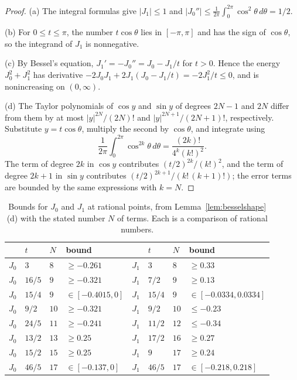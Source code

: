 \documentclass[10pt]{article}
\theoremstyle{remark}
\begin{document}
\begin{proof}
(a) The integral formulas give $|J_1|\le1$ and $|J_0''|\le\frac1{2\pi}\int_0^{2\pi}\cos^2\theta\,d\theta=1/2$.

(b) For $0\le t\le\pi$, the number $t\cos\theta$ lies in $[-\pi,\pi]$ and has the sign of $\cos\theta$, so the integrand of $J_1$ is nonnegative.

(c) By Bessel's equation, $J_1'=-J_0''=J_0-J_1/t$ for $t>0$. Hence the energy $J_0^2+J_1^2$ has derivative $-2J_0J_1+2J_1(J_0-J_1/t)=-2J_1^2/t\le0$, and is nonincreasing on $(0,\infty)$.

(d) The Taylor polynomials of $\cos y$ and $\sin y$ of degrees $2N-1$ and $2N$ differ from them by at most $|y|^{2N}/(2N)!$ and $|y|^{2N+1}/(2N+1)!$, respectively. Substitute $y=t\cos\theta$, multiply the second by $\cos\theta$, and integrate using
\[
 \frac1{2\pi}\int_0^{2\pi}\cos^{2k}\theta\,d\theta=\frac{(2k)!}{4^k(k!)^2}.
\]
The term of degree $2k$ in $\cos y$ contributes $(t/2)^{2k}/(k!)^2$, and the term of degree $2k+1$ in $\sin y$ contributes $(t/2)^{2k+1}/(k!\,(k+1)!)$; the error terms are bounded by the same expressions with $k=N$.
\end{proof}

\begin{table}[ht]
\centering
\begin{tabular}{llll|llll}
 & $t$ & $N$ & bound & & $t$ & $N$ & bound\\\hline
 $J_0$ & $3$ & $8$ & $\ge-0.261$ & $J_1$ & $3$ & $8$ & $\ge0.33$\\
 $J_0$ & $16/5$ & $9$ & $\ge-0.321$ & $J_1$ & $7/2$ & $9$ & $\ge0.13$\\
 $J_0$ & $15/4$ & $9$ & $\in[-0.4015,0]$ & $J_1$ & $15/4$ & $9$ & $\in[-0.0334,0.0334]$\\
 $J_0$ & $9/2$ & $10$ & $\ge-0.321$ & $J_1$ & $9/2$ & $10$ & $\le-0.23$\\
 $J_0$ & $24/5$ & $11$ & $\ge-0.241$ & $J_1$ & $11/2$ & $12$ & $\le-0.34$\\
 $J_0$ & $13/2$ & $13$ & $\ge0.25$ & $J_1$ & $17/2$ & $16$ & $\ge0.27$\\
 $J_0$ & $15/2$ & $15$ & $\ge0.25$ & $J_1$ & $9$ & $17$ & $\ge0.24$\\
 $J_0$ & $46/5$ & $17$ & $\in[-0.137,0]$ & $J_1$ & $46/5$ & $17$ & $\in[-0.218,0.218]$
\end{tabular}
\caption{Bounds for $J_0$ and $J_1$ at rational points, from Lemma~\ref{lem:besselshape}(d) with the stated number $N$ of terms. Each is a comparison of rational numbers.}
\label{tab:bessel}
\end{table}
\end{document}
